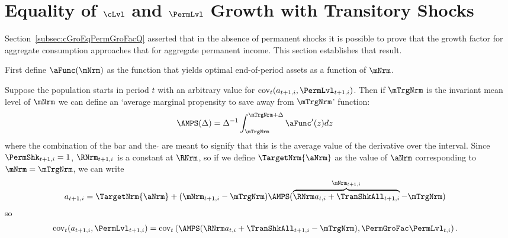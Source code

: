 \documentclass[\econtexRoot/Endo]{subfiles}
\begin{document}
\section{Equality of \texorpdfstring{$\cLvl$}{} and \texorpdfstring{$\PermLvl$}{p} Growth with Transitory Shocks}\label{sec:ApndxCGroIsPermGroFac}

Section~\ref{subsec:cGroEqPermGroFacQ} asserted that in the absence of permanent shocks it is possible to prove that the growth factor for aggregate consumption approaches that for aggregate permanent income.  This section establishes that result.

First define $\aFunc(\mNrm)$ as the function that yields optimal end-of-period assets as a function of $\mNrm$.

Suppose the population starts in period $t$ with an arbitrary value for
 $\mbox{cov}_{t}(a_{t+1,i},\PermLvl_{t+1,i})$. 
 Then if $\mTrgNrm$ is the invariant mean level of $\mNrm$ we can define an `average marginal propensity to save away from $\mTrgNrm$' function:
\begin{equation}\begin{gathered}\begin{aligned}
 \AMPS(\Delta)  & =  \Delta^{-1}\int_{\mTrgNrm}^{\mTrgNrm+\Delta} \aFunc^{\prime}(z)
 dz \label{eq:checkaFunc} \nonumber
\end{aligned}\end{gathered}\end{equation}
where the combination of the bar and the $\acute{}$ are meant to signify that this is the average value of the derivative over the interval.
Since $\PermShk_{t+1,i}=1$, $\RNrm_{t+1,i}$ is a constant at $\RNrm$, so if we define $\TargetNrm{\aNrm}$ as the value of $\aNrm$ corresponding to $\mNrm = \mTrgNrm$, we can write
\begin{equation}\begin{gathered}\begin{aligned}
  a_{t+1,i} 
& =   \TargetNrm{\aNrm}+(\mNrm_{t+1,i}-\mTrgNrm)\AMPS(\overbrace{\RNrm
    a_{t,i}+\TranShkAll_{t+1,i}}^{\mNrm_{t+1,i}}-\mTrgNrm) \nonumber
\end{aligned}\end{gathered}\end{equation}
so
\begin{equation}\begin{gathered}\begin{aligned}
\mbox{cov}_{t}(a_{t+1,i},\PermLvl_{t+1,i})
 & = \mbox{cov}_{t}\left(\AMPS(\RNrm  a_{t,i}+\TranShkAll_{t+1,i}-\mTrgNrm)
  ,\PermGroFac   \PermLvl_{t,i}\right). \nonumber
\end{aligned}\end{gathered}\end{equation}
\end{document}
